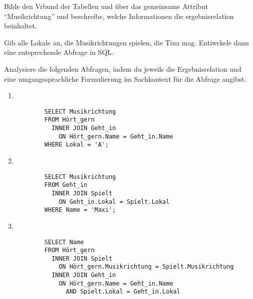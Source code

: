 \documentclass[10pt, a4paper, ngerman]{arbeitsblatt}
\begin{document}
\begin{aufgabe}
\begin{enuma}
	\item Bilde den Vrbund der Tabellen  und  über das gemeinsame Attribut \enquote{Musikrichtung} und beschreibe, welche Informationen die ergebnisrelation beinhaltet.

	\item Gib alle Lokale an, die Musikrichtungen spielen, die Tina mag. Entiwckele dann eine entsprechende Abfrage in SQL.

	\item Analysiere die folgenden Abfragen, indem du jeweils die Ergebnisrelation und eine umgangssprachliche Formulierung im Sachkontext für die Abfrage angibst.
	\begin{enumerate}
		\item ~\\[-3em]\begin{verbatim}
		SELECT Musikrichtung
		FROM Hört_gern
		  INNER JOIN Geht_in
		    ON Hört_gern.Name = Geht_in.Name
		WHERE Lokal = 'A';
		\end{verbatim}

		\item ~\\[-3em]\begin{verbatim}
		SELECT Musikrichtung
		FROM Geht_in
		  INNER JOIN Spielt
			ON Geht_in.Lokal = Spielt.Lokal
		WHERE Name = 'Maxi';
		\end{verbatim}

		\item ~\\[-3em]\begin{verbatim}
		SELECT Name
		FROM Hört_gern
		  INNER JOIN Spielt
			ON Hört_gern.Musikrichtung = Spielt.Musikrichtung
		  INNER JOIN Geht_in
		    ON Hört_gern.Name = Geht_in.Name
			  AND Spielt.Lokal = Geht_in.Lokal
		\end{verbatim}
	\end{enumerate}
\end{enuma}
\end{aufgabe}
\end{document}

